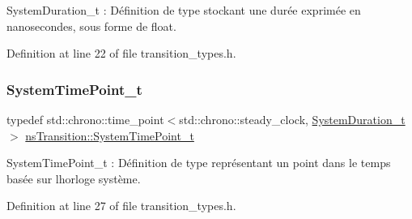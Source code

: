 System\+Duration\+\_\+t \+: Définition de type stockant une durée exprimée en nanosecondes, sous forme de float. 



Definition at line 22 of file transition\+\_\+types.\+h.

\mbox{\label{namespacens_transition_a83c5a8a16c957b737d76d281c7345aa6}} 
\subsubsection{\texorpdfstring{System\+Time\+Point\+\_\+t}{SystemTimePoint\_t}}
{\footnotesize\ttfamily typedef std\+::chrono\+::time\+\_\+point$<$std\+::chrono\+::steady\+\_\+clock, \hyperlink{namespacens_transition_a260258f249f46ff9a62da721537f87af}{System\+Duration\+\_\+t}$>$ \hyperlink{namespacens_transition_a83c5a8a16c957b737d76d281c7345aa6}{ns\+Transition\+::\+System\+Time\+Point\+\_\+t}}



System\+Time\+Point\+\_\+t \+: Définition de type représentant un point dans le temps basée sur l\textquotesingle{}horloge système. 



Definition at line 27 of file transition\+\_\+types.\+h.

